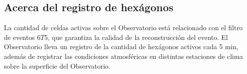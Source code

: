 \subsection{Acerca del registro de hexágonos}\label{hexagonos_rate}

La cantidad de celdas  activas sobre el Observatorio está relacionado con el filtro de eventos $6T5$, que garantiza la calidad de la reconstrucción del evento. El Observatorio lleva un registro de la cantidad de hexágonos activos cada 5 min, además de registrar las condiciones atmosféricas en distintas estaciones de clima sobre la superficie del Observatorio. 




